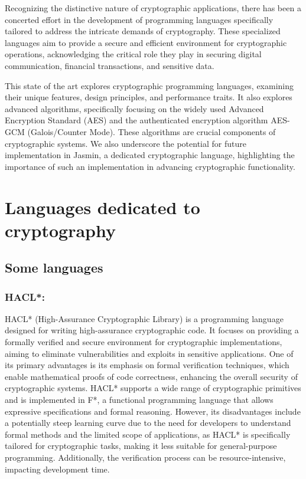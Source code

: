 \documentclass[runningheads]{llncs}
\begin{document}
Recognizing the distinctive nature of cryptographic applications, there has been a concerted effort in the development of programming languages specifically tailored to address the intricate demands of cryptography. These specialized languages aim to provide a secure and efficient environment for cryptographic operations, acknowledging the critical role they play in securing digital communication, financial transactions, and sensitive data.

This state of the art explores cryptographic programming languages, examining their unique features, design principles, and performance traits. It also explores advanced algorithms, specifically focusing on the widely used Advanced Encryption Standard (AES) and the authenticated encryption algorithm AES-GCM (Galois/Counter Mode). These algorithms are crucial components of cryptographic systems. We also underscore the potential for future implementation in Jasmin, a dedicated cryptographic language, highlighting the importance of such an implementation in advancing cryptographic functionality.

\section{Languages dedicated to cryptography}

\subsection{Some languages}
\subsubsection{HACL*:}
HACL*\cite{hacl_star_paper} (High-Assurance Cryptographic Library) is a programming language designed for writing high-assurance cryptographic code. It focuses on providing a formally verified and secure environment for cryptographic implementations, aiming to eliminate vulnerabilities and exploits in sensitive applications. One of its primary advantages is its emphasis on formal verification techniques, which enable mathematical proofs of code correctness, enhancing the overall security of cryptographic systems. HACL* supports a wide range of cryptographic primitives and is implemented in F*, a functional programming language that allows expressive specifications and formal reasoning. However, its disadvantages include a potentially steep learning curve due to the need for developers to understand formal methods and the limited scope of applications, as HACL* is specifically tailored for cryptographic tasks, making it less suitable for general-purpose programming. Additionally, the verification process can be resource-intensive, impacting development time.
\end{document}
